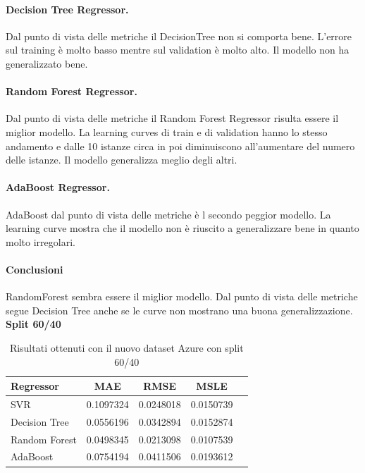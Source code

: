 \paragraph{\textbf{Decision Tree Regressor}.}
Dal punto di vista delle metriche il DecisionTree non si comporta bene. L'errore sul training è molto basso mentre sul validation è molto alto. Il modello non ha generalizzato bene.
\paragraph{\textbf{Random Forest Regressor}.}
Dal punto di vista delle metriche il Random Forest Regressor risulta essere il miglior modello.
La learning curves di train e di validation hanno lo stesso andamento e dalle 10 istanze circa in poi diminuiscono all'aumentare del numero delle istanze. Il modello generalizza meglio degli altri.
\paragraph{\textbf{AdaBoost Regressor}.}
AdaBoost dal punto di vista delle metriche è l secondo peggior modello. La learning curve mostra che il modello non è riuscito a generalizzare bene in quanto molto irregolari.

\paragraph{\textbf{Conclusioni}} RandomForest sembra essere il miglior modello. Dal punto di vista delle metriche segue Decision Tree anche se le curve non mostrano una buona generalizzazione.
\noindent\textbf{Split 60/40}

\begin{table}[H]
    \centering
    \begin{tabular}{|>{\centering\arraybackslash}m{5cm}|c|c|c|c|}
        \hline
        \textbf{Regressor} & \textbf{MAE} & \textbf{RMSE} & \textbf{MSLE} \\ [10pt]
        \hline
        SVR & 0.1097324 & 0.0248018 & 0.0150739 \\ [10pt]
        \hline
        Decision Tree & 0.0556196 & 0.0342894 & 0.0152874 \\ [10pt]
        \hline
        Random Forest & 0.0498345 & 0.0213098 & 0.0107539 \\ [10pt]
        \hline
        AdaBoost & 0.0754194 & 0.0411506 & 0.0193612 \\ [10pt]
        \hline
    \end{tabular}
    \caption{Risultati ottenuti con il nuovo dataset Azure con split 60/40}
    \label{tab:results}
\end{table}

